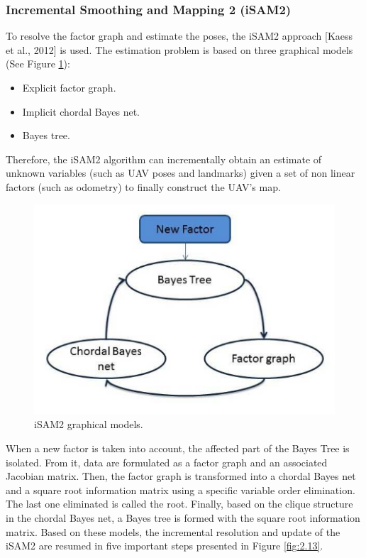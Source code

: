 \subsubsection{Incremental Smoothing and Mapping 2 (iSAM2)}
To resolve the factor graph and estimate the poses, the iSAM2 approach [Kaess et al., 2012] is used. The estimation problem is based on three graphical models (See Figure \ref{fig:2.12}):
\begin{itemize}
    \item Explicit factor graph.
    \item Implicit chordal Bayes net.
    \item Bayes tree.
\end{itemize}
Therefore, the iSAM2 algorithm can incrementally obtain an estimate of unknown variables (such as UAV poses and landmarks) given a set of non linear factors (such as odometry) to ﬁnally construct the UAV’s map.
\begin{figure}[H]
    \centering
    \includegraphics[scale=0.7]{assets/2_12.png}
    \caption{iSAM2 graphical models.}
    \label{fig:2.12}
\end{figure}
When a new factor is taken into account, the aﬀected part of the Bayes Tree is isolated. From it, data are formulated as a factor graph and an associated Jacobian matrix. Then, the factor graph is transformed into a chordal Bayes net and a square root information matrix using a speciﬁc variable order elimination. The last one eliminated is called the root. Finally, based on the clique structure in the chordal Bayes net, a Bayes tree is formed with the square root information matrix. Based on these models, the incremental resolution and update of the iSAM2 are resumed in ﬁve important steps presented in Figure \ref{fig:2.13}.
